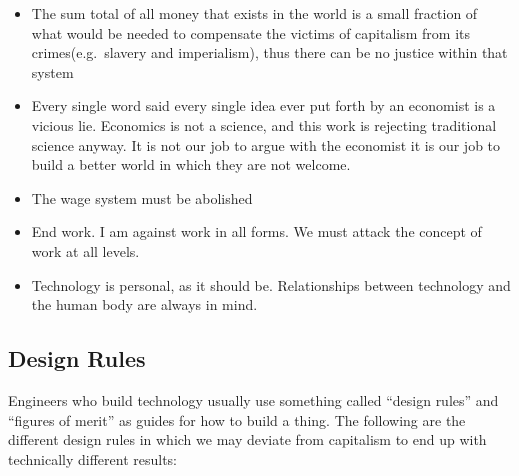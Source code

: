 \begin{itemize}
\item
  The sum total of all money that exists in the world is a small
  fraction of what would be needed to compensate the victims of
  capitalism from its crimes(e.g.~slavery and imperialism), thus there
  can be no justice within that system
\item
  Every single word said every single idea ever put forth by an
  economist is a vicious lie. Economics is not a science, and this work
  is rejecting traditional science anyway. It is not our job to argue
  with the economist it is our job to build a better world in which they
  are not welcome.
\item
  The wage system must be abolished
\item
  End work. I am against work in all forms. We must attack the concept
  of work at all levels.
\item
  Technology is personal, as it should be. Relationships between
  technology and the human body are always in mind.
\end{itemize}

\subsection{Design Rules}\label{design-rules}

Engineers who build technology usually use something called ``design
rules'' and ``figures of merit'' as guides for how to build a thing. The
following are the different design rules in which we may deviate from
capitalism to end up with technically different results:

